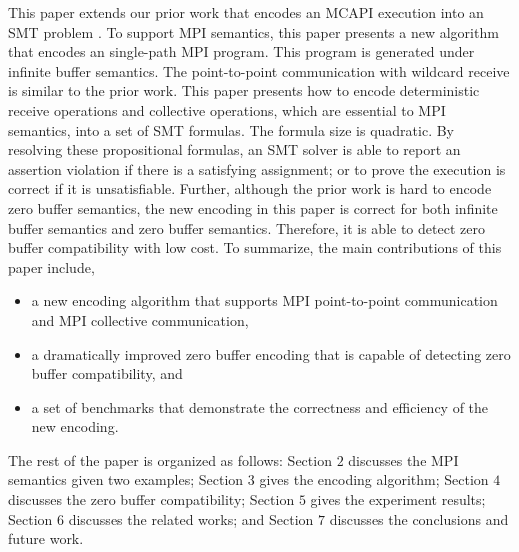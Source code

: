This paper extends our prior work that encodes an MCAPI execution into an SMT problem \cite{DBLP:conf/kbse/HuangMM13}. To support MPI semantics, this paper presents a new algorithm that encodes an single-path MPI program. This program is generated under infinite buffer semantics. The point-to-point communication with wildcard receive is similar to the prior work. This paper presents how to encode deterministic receive operations and collective operations, which are essential to MPI semantics, into a set of SMT formulas. The formula size is quadratic. By resolving these propositional formulas, an SMT solver is able to report an assertion violation if there is a satisfying assignment; or to prove the execution is correct if it is unsatisfiable. Further, although the prior work \cite{DBLP:conf/kbse/HuangMM13} is hard to encode zero buffer semantics, the new encoding in this paper is correct for both infinite buffer semantics and zero buffer semantics. Therefore, it is able to detect zero buffer compatibility with low cost. To summarize, the main contributions of this paper include,
\begin{itemize}
\item a new encoding algorithm that supports MPI point-to-point communication and MPI collective communication,
\item a dramatically improved zero buffer encoding that is capable of detecting zero buffer compatibility, and
\item a set of benchmarks that demonstrate the correctness and efficiency of the new encoding.
\end{itemize}

The rest of the paper is organized as follows: Section $2$ discusses the MPI semantics given two examples; Section $3$ gives the encoding algorithm; Section $4$ discusses the zero buffer compatibility; Section $5$ gives the experiment results; Section $6$ discusses the related works; and Section $7$ discusses the conclusions and future work.

\examplefigone


           